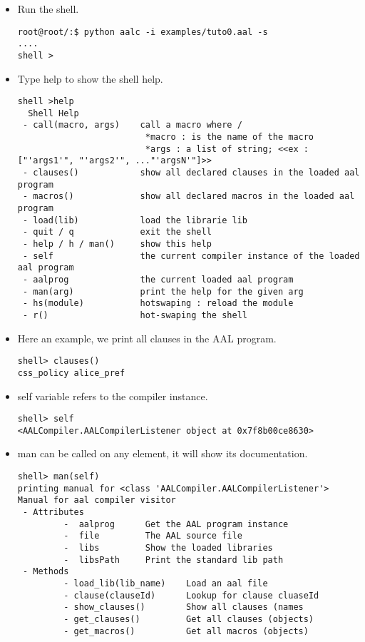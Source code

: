 {
\lstset{style=shell}

\begin{itemize}
	\item Run the shell.
\begin{lstlisting}
root@root/:$ python aalc -i examples/tuto0.aal -s
....
shell >
\end{lstlisting}

  \item Type help to show the shell help.
\begin{lstlisting}
shell >help
  Shell Help
 - call(macro, args)    call a macro where /
                         *macro : is the name of the macro
                         *args : a list of string; <<ex :["'args1'", "'args2'", ..."'argsN'"]>>
 - clauses()            show all declared clauses in the loaded aal program
 - macros()             show all declared macros in the loaded aal program
 - load(lib)            load the librarie lib
 - quit / q             exit the shell
 - help / h / man()     show this help
 - self                 the current compiler instance of the loaded aal program
 - aalprog              the current loaded aal program
 - man(arg)             print the help for the given arg
 - hs(module)           hotswaping : reload the module
 - r()                  hot-swaping the shell
\end{lstlisting}

  \item Here an example, we print all clauses in the AAL program.
\begin{lstlisting}
shell> clauses()
css_policy alice_pref

\end{lstlisting}

  \item self variable refers to the compiler instance.
\begin{lstlisting}
shell> self
<AALCompiler.AALCompilerListener object at 0x7f8b00ce8630>
\end{lstlisting}

    \item man can be called on any element, it will show its documentation.
\begin{lstlisting}
shell> man(self)
printing manual for <class 'AALCompiler.AALCompilerListener'>
Manual for aal compiler visitor
 - Attributes
         -  aalprog      Get the AAL program instance
         -  file         The AAL source file
         -  libs         Show the loaded libraries
         -  libsPath     Print the standard lib path
 - Methods
         - load_lib(lib_name)    Load an aal file
         - clause(clauseId)      Lookup for clause cluaseId
         - show_clauses()        Show all clauses (names
         - get_clauses()         Get all clauses (objects)
         - get_macros()          Get all macros (objects)


\end{lstlisting}
\end{itemize}}
